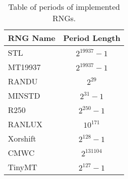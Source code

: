 \begin{table}[tb]
    \caption{Table of periods of implemented RNGs.}
    \label{tab:period}
    \begin{center}
        \begin{tabular}{l|c}
        \hline
        \hline
\textbf{RNG Name} & \textbf{Period Length} \\
        \hline
STL               & $2^{19937}-1$  \\
MT19937           & $2^{19937}-1$  \\
RANDU             & $2^{29}$       \\
MINSTD            & $2^{31}-1$     \\
R250              & $2^{250}-1$    \\
RANLUX            & $10^171$       \\
Xorshift          & $2^{128}-1$    \\
CMWC              & $2^{131104}$   \\
TinyMT            & $2^{127}-1$    \\
        \hline
        \hline
        \end{tabular}
    \end{center}
\end{table}
